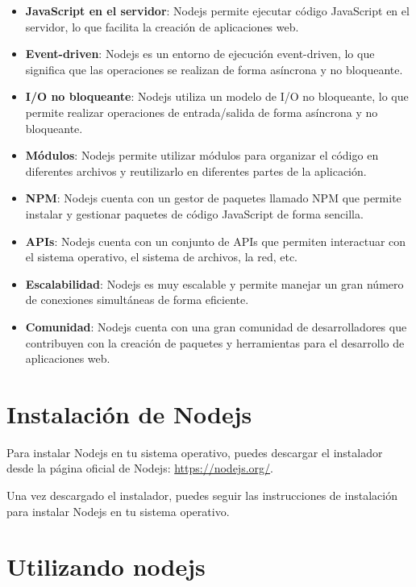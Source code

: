 \documentclass[
  a4paper,
  DIV=11,
  numbers=noendperiod,
  onepage,
  openany]{scrreprt}
\begin{document}
\begin{tcolorbox}
\begin{itemize}
\item
  \textbf{JavaScript en el servidor}: Nodejs permite ejecutar código
  JavaScript en el servidor, lo que facilita la creación de aplicaciones
  web.
\item
  \textbf{Event-driven}: Nodejs es un entorno de ejecución event-driven,
  lo que significa que las operaciones se realizan de forma asíncrona y
  no bloqueante.
\item
  \textbf{I/O no bloqueante}: Nodejs utiliza un modelo de I/O no
  bloqueante, lo que permite realizar operaciones de entrada/salida de
  forma asíncrona y no bloqueante.
\item
  \textbf{Módulos}: Nodejs permite utilizar módulos para organizar el
  código en diferentes archivos y reutilizarlo en diferentes partes de
  la aplicación.
\item
  \textbf{NPM}: Nodejs cuenta con un gestor de paquetes llamado NPM que
  permite instalar y gestionar paquetes de código JavaScript de forma
  sencilla.
\item
  \textbf{APIs}: Nodejs cuenta con un conjunto de APIs que permiten
  interactuar con el sistema operativo, el sistema de archivos, la red,
  etc.
\item
  \textbf{Escalabilidad}: Nodejs es muy escalable y permite manejar un
  gran número de conexiones simultáneas de forma eficiente.
\item
  \textbf{Comunidad}: Nodejs cuenta con una gran comunidad de
  desarrolladores que contribuyen con la creación de paquetes y
  herramientas para el desarrollo de aplicaciones web.
\end{itemize}

\section{Instalación de Nodejs}\label{instalaciuxf3n-de-nodejs}

Para instalar Nodejs en tu sistema operativo, puedes descargar el
instalador desde la página oficial de Nodejs: \url{https://nodejs.org/}.

Una vez descargado el instalador, puedes seguir las instrucciones de
instalación para instalar Nodejs en tu sistema operativo.

\section{Utilizando nodejs}\label{utilizando-nodejs}


\end{tcolorbox}
\end{document}

